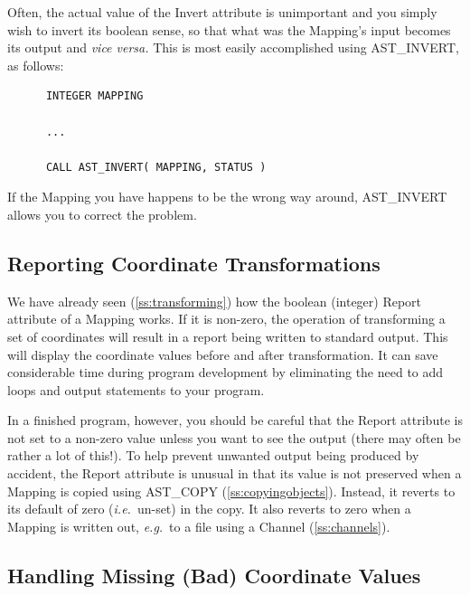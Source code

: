 \documentclass[twoside,11pt]{article}
\newcommand{\htmlref}[2]{#1}
\newcommand{\secref}[1]{\S\ref{#1}}
\renewcommand{\secref}[1]{\ref{#1}}
\begin{document}
Often, the actual value of the Invert attribute is unimportant and you
simply wish to invert its boolean sense, so that what was the
Mapping's input becomes its output and {\em{vice versa.}} This is most
easily accomplished using \htmlref{AST\_INVERT}{AST_INVERT}, as follows:

\small
\begin{verbatim}
      INTEGER MAPPING

      ...

      CALL AST_INVERT( MAPPING, STATUS )
\end{verbatim}
\normalsize

If the Mapping you have happens to be the wrong way around,
AST\_INVERT allows you to correct the problem.

\subsection{Reporting Coordinate Transformations}

We have already seen (\secref{ss:transforming}) how the boolean
(integer) \htmlref{Report}{Report} attribute of a \htmlref{Mapping}{Mapping} works. If it is non-zero, the
operation of transforming a set of coordinates will result in a report
being written to standard output. This will display the coordinate
values before and after transformation. It can save considerable time
during program development by eliminating the need to add loops and
output statements to your program.

In a finished program, however, you should be careful that the Report
attribute is not set to a non-zero value unless you want to see the
output (there may often be rather a lot of this!). To help prevent
unwanted output being produced by accident, the Report attribute is
unusual in that its value is not preserved when a Mapping is copied
using \htmlref{AST\_COPY}{AST_COPY} (\secref{ss:copyingobjects}). Instead, it reverts to
its default of zero ({\em{i.e.}}\ un-set) in the copy. It also reverts
to zero when a Mapping is written out, {\em{e.g.}}\ to a file using a
\htmlref{Channel}{Channel} (\secref{ss:channels}).


\subsection{\label{ss:badcoordinates}Handling Missing (Bad) Coordinate Values}
\end{document}
